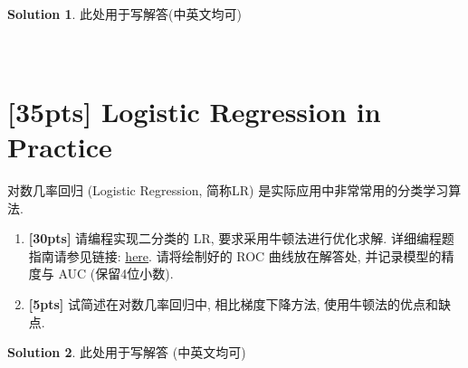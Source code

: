 \documentclass[a4paper,UTF8]{article}
\numberwithin{equation}{section}
\theoremstyle{definition}
\newtheorem*{solution}{Solution}
\begin{document}
\begin{solution}
此处用于写解答(中英文均可)
~\\
~\\
~\\
\end{solution}

\newpage
\section{[35pts] Logistic Regression in Practice}
对数几率回归 (Logistic Regression, 简称LR) 是实际应用中非常常用的分类学习算法.
\begin{enumerate}
    \item[(1)]  \textbf{[30pts]} 请编程实现二分类的 LR, 要求采用牛顿法进行优化求解. 详细编程题指南请参见链接: \href{https://www.lamda.nju.edu.cn/ML2023Spring/homework/hw1/hw1-code.html}{here}. 请将绘制好的 ROC 曲线放在解答处, 并记录模型的精度与 AUC (保留4位小数).
    \item[(2)]  \textbf{[5pts]} 试简述在对数几率回归中, 相比梯度下降方法, 使用牛顿法的优点和缺点.
\end{enumerate}

\begin{solution}
此处用于写解答 (中英文均可)
~\\
~\\
~\\
~\\
\end{solution}
\end{document}
